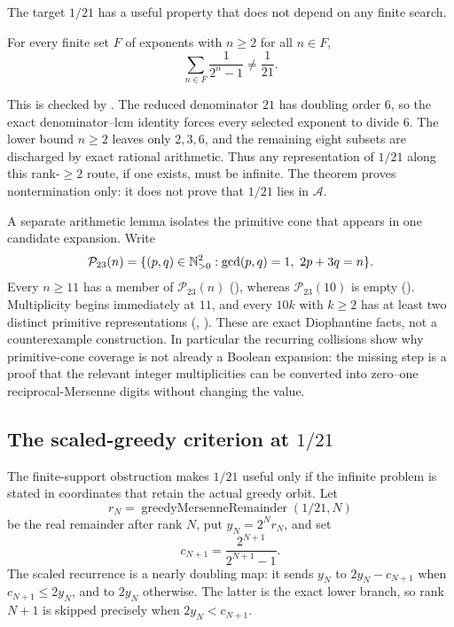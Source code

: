 \documentclass[11pt]{article}
\newcommand{\Ach}{\mathcal A}
\begin{document}
The target $1/21$ has a useful property that does not depend on any finite
search.

\begin{theorem}\label{res:one-over-twenty-one}
For every finite set $F$ of exponents with $n\ge2$ for all $n\in F$,
\[
  \sum_{n\in F}\frac{1}{2^n-1}\ne\frac1{21}.
\]
\end{theorem}

\noindent This is checked by
.
The reduced denominator $21$ has doubling order $6$, so the exact
denominator--lcm identity forces every selected exponent to divide $6$.
The lower bound $n\ge2$ leaves only $2,3,6$, and the remaining eight subsets
are discharged by exact rational arithmetic.  Thus any representation of
$1/21$ along this rank-$\ge2$ route, if one exists, must be infinite.
The theorem proves nontermination only: it does not prove that $1/21$ lies
in $\Ach$.

A separate arithmetic lemma isolates the primitive cone that appears in one
candidate expansion.  Write
\[
  \mathcal P_{23}(n)=
  \{(p,q)\in\mathbb{N}_{>0}^2:\gcd(p,q)=1,\ 2p+3q=n\}.
\]
Every $n\ge11$ has a member of $\mathcal P_{23}(n)$
(),
whereas $\mathcal P_{23}(10)$ is empty
().
Multiplicity begins immediately at $11$, and every $10k$ with $k\ge2$ has
at least two distinct primitive representations
(,
).
These are exact Diophantine facts, not a counterexample construction.  In
particular the recurring collisions show why primitive-cone coverage is not
already a Boolean expansion: the missing step is a proof that the relevant
integer multiplicities can be converted into zero--one reciprocal-Mersenne
digits without changing the value.

\subsection{The scaled-greedy criterion at \texorpdfstring{$1/21$}{1/21}}

The finite-support obstruction makes $1/21$ useful only if the infinite
problem is stated in coordinates that retain the actual greedy orbit.  Let
\[
 r_N=\operatorname{greedyMersenneRemainder}(1/21,N)
\]
be the real remainder after rank $N$, put $y_N=2^Nr_N$, and set
\[
 c_{N+1}=\frac{2^{N+1}}{2^{N+1}-1}.
\]
The scaled recurrence is a nearly doubling map: it sends $y_N$ to
$2y_N-c_{N+1}$ when $c_{N+1}\le2y_N$, and to $2y_N$ otherwise.  The latter is
the exact lower branch, so rank $N+1$ is skipped precisely when
$2y_N<c_{N+1}$.
\end{document}
